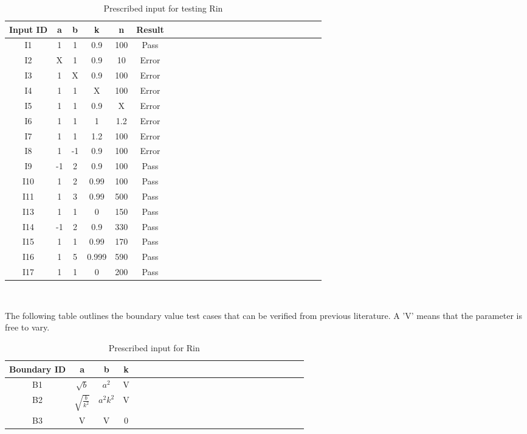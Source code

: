 \documentclass[12pt, titlepage]{article}
\begin{document}
\begin{table}[h!]
	\centering
	\begin{tabular}{|c|c|c|c|c|c|c|c|c|c|c|c|c|c|c|c|c|c|c|c|c|c|c|c|}
		\hline        
		Input ID& a& b & k & n& Result \\
		\hline
		I1     &1 &1 &0.9 &100 & Pass \\ \hline
		I2    &X &1 &0.9 &10 & Error \\ \hline
		I3    &1 &X &0.9 &100 & Error\\ \hline 
		I4    &1 &1 &X &100 &Error \\ \hline 
		I5     &1 &1 &0.9 &X &Error \\ \hline
		I6    &1 &1 &1 & 1.2& Error\\ \hline
		I7    &1 &1 &1.2 & 100&Error\\ \hline 
		I8    &1 &-1 &0.9 &100& Error \\ \hline
		I9     &-1 &2 &0.9 &100 & Pass \\ \hline
		I10    &1 &2 &0.99 &100 & Pass\\ \hline
		I11    &1 &3 &0.99 &500 & Pass \\ \hline 
		I13   &1 &1 &0 &150 & Pass  \\ \hline
		I14     &-1 &2 &0.9 &330 & Pass \\ \hline
		I15    &1 &1 &0.99 &170 & Pass\\ \hline
		I16    &1 &5 &0.999 &590 & Pass \\ \hline 
		I17   &1 &1 &0 &200 & Pass  \\ 
		\hline
	\end{tabular}\\
	\caption{Prescribed input for testing Rin}
	\label{Table:D_11}
\end{table} 

The following table outlines the boundary value test cases that can be verified 
from previous literature. A 'V' means that the parameter is free to vary.
\begin{table}[h!]
	\centering
	\begin{tabular}{|c|c|c|c|c|c|c|c|c|c|c|c|c|c|c|c|c|c|c|c|c|c|c|c|}
		\hline        
		Boundary ID& a& b& k  \\
		\hline
		B1     &$\sqrt{b}$ &$a^{2}$ &V    \\ \hline
		B2    &$\sqrt{\frac{b}{k^{2}}}$ &$a^{2}k^{2}$ &V   \\ \hline
		B3    &V &V &0  \\ 
		\hline
	\end{tabular}\\
	\caption{Prescribed input for Rin}
	\label{Table:D_22}
\end{table} 
\end{document}
